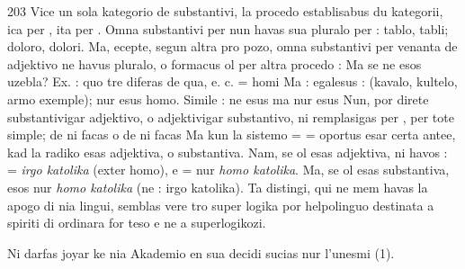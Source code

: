 \begin{VUpage}[207]{203}
Vice un sola kategorio de substantivi, la procedo \nl
{} establisabus du kategorii, ica per , ita per .\nl
Omna substantivi per  nun havas sua pluralo per  :\nl
tablo, tabli; doloro, dolori. Ma, ecepte, segun altra pro\cc
pozo, omna substantivi per  venanta de adjektivo ne havus\nl
pluralo, o formacus ol per altra procedo : \nl
Ma se  ne esos uzebla? Ex. : \nl
{} quo tre diferas de \cc
qua, e. c.  = homi \nl
{} Ma :  egalesus : \nl
{} (kavalo, kultelo, armo exemple); nur\nl
{} esus homo. Simile : \cc
{} ne esus  ma  nur \cc
{} esus  Nun, por direte substantivigar\nl
adjektivo, o adjektivigar substantivo, ni remplasigas \nl
per ,  per  tote simple; de  ni facas \nl
o de  ni facas  Ma kun la sistemo  = \nl
{} =  oportus esar certa antee, kad la radiko \nl
esas adjektiva, o substantiva. Nam, se ol esas adjektiva, ni\nl
havos :  = \textit{irgo katolika} (exter homo), e  =\nl
nur \textit{homo katolika}. Ma, se ol esas substantiva,  esos\nl
nur \textit{homo katolika} (ne : irgo katolika). Ta distingi, qui ne\nl
mem havas la apogo di nia lingui, semblas vere tro super\cc
logika por helpolinguo destinata a spiriti di ordinara for\cc
teso e ne a superlogikozi.

Ni darfas joyar ke nia Akademio en sua decidi sucias nur\nl
l'unesmi (1).
\end{VUpage}


